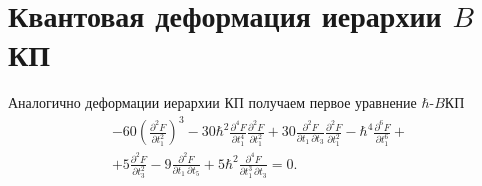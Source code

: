 \documentclass[a5paper,twoside]{article}
\begin{document}
\section{Квантовая деформация иерархии $B$КП}
Аналогично деформации иерархии КП получаем первое уравнение $\hbar $-$B$КП
\begin{multline}
-60 \left(\frac{\partial ^2F}{\partial
   t_1^2}\right)^3-30\hbar ^2 \frac{\partial ^4F}{\partial
   t_1^4} \frac{\partial ^2F}{\partial
   t_1^2}+30 \frac{\partial ^2F}{\partial t_1\, \partial t_3}
   \frac{\partial ^2F}{\partial t_1^2}-\hbar ^4\frac{\partial
   ^6F}{\partial t_1^6}+\\+5 \frac{\partial ^2F}{\partial
   t_3^2}-9 \frac{\partial ^2F}{\partial t_1\, \partial t_5}+5
   \hbar ^2\frac{\partial ^4F}{\partial t_1^3\, \partial t_3}=0	
	\label{}
.\end{multline}
\end{document}
